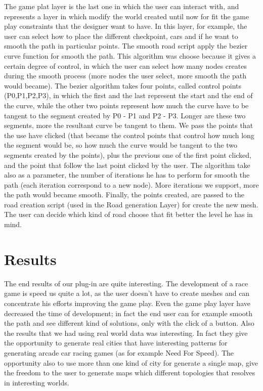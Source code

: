 \documentclass[conference]{IEEEtran}
\begin{document}
The game plat layer is the last one in which the user can interact with, and represents a layer in which modify the world created until now for fit the game play constraints that the designer want to have. In this layer, for example,  the user can select how to place the different checkpoint, cars and if he want to smooth the path in particular points. \newline
The smooth road script apply the bezier curve function for smooth the path. This algorithm was choose because it gives a certain degree of control, in which the user can select how many nodes creates during the smooth process (more nodes the user select, more smooth the path would became). The bezier algorithm takes four points, called control points (P0,P1,P2,P3), in which the first and the last represent the start and the end of the curve, while the other two points represent how much the curve have to be tangent to the segment created by P0 - P1 and P2 - P3. Longer are these two segments, more the resultant curve be tangent to them.  We pass the points that the use have clicked (that became the control points that control how much long the segment would be, so how much the curve would be tangent to the two segments created by the points), plus the previous one of the first point clicked, and the  point that follow the last point clicked by the user. The algorithm take also as a parameter, the number of iterations he has to perform for smooth the path (each iteration correspond to a new node). More iterations we support, more the path would became smooth. Finally, the points created, are passed to the road creation script (used in the Road generation Layer) for create the new mesh.\newline
The user can decide which kind of road choose that fit better the level he has in mind.

\section{Results}

The end results of our plug-in are quite interesting. The development of a race game is speed us quite a lot, as the user doesn't have to create meshes  and can  concentrate his efforts improving the game play. Even the game play layer have decreased the time of development; in fact the end user can for example smooth the path and see different kind of solutions, only with the click of a button.\newline
Also the results that we had using real world data was interesting.  In fact they give the opportunity to generate real cities that have interesting patterns for generating arcade car racing games (as for example Need For Speed). The opportunity also to use more than one kind of city for generate a single map, give the freedom to the user to generate maps which different topologies that resolves in interesting worlds.
\end{document}
